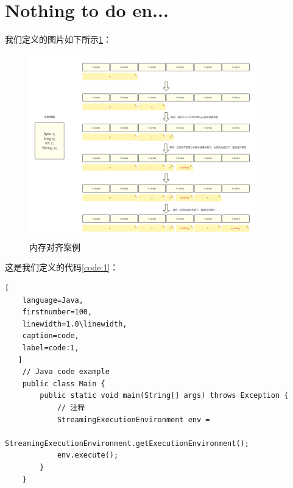 \documentclass{template}
\begin{document}
\section{Nothing to do en...}
我们定义的图片如下所示\ref{fig:1}：
\begin{figure}[ht]
    \centering
    \includegraphics[width=0.9\textwidth]{内存对齐案例}
    \caption{内存对齐案例}
    \label{fig:1}
\end{figure}

这是我们定义的代码\autoref{code:1}：
\begin{lstlisting}[
    language=Java, 
    firstnumber=100, 
    linewidth=1.0\linewidth, 
    caption=code,
    label=code:1,
   ]
    // Java code example
    public class Main {
        public static void main(String[] args) throws Exception {
            // 注释
            StreamingExecutionEnvironment env = 
                    StreamingExecutionEnvironment.getExecutionEnvironment();
            env.execute();
        }
    }
\end{lstlisting}
\end{document}
